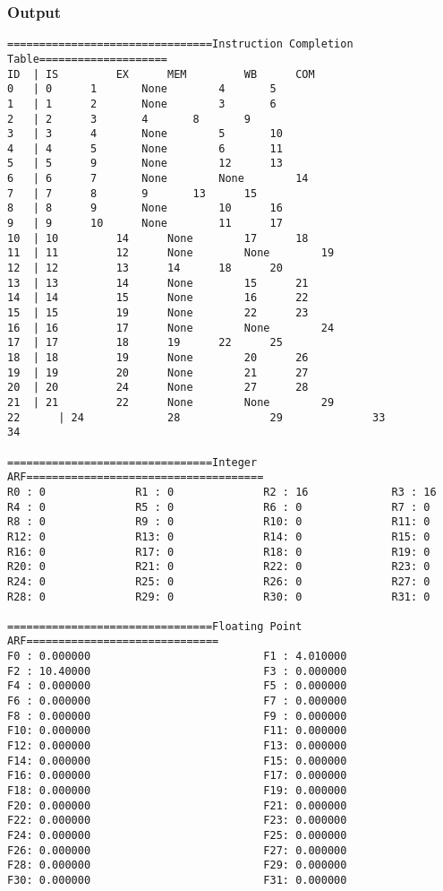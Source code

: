 \documentclass[12pt]{article}
\begin{document}
\subsubsection*{Output}
\begin{verbatim}
================================Instruction Completion Table====================
ID	| IS		 EX		 MEM		 WB		 COM
0	| 0		 1		 None		 4		 5
1	| 1		 2		 None		 3		 6
2	| 2		 3		 4		 8		 9
3	| 3		 4		 None		 5		 10
4	| 4		 5		 None		 6		 11
5	| 5		 9		 None		 12		 13
6	| 6		 7		 None		 None		 14
7	| 7		 8		 9		 13		 15
8	| 8		 9		 None		 10		 16
9	| 9		 10		 None		 11		 17
10	| 10		 14		 None		 17		 18
11	| 11		 12		 None		 None		 19
12	| 12		 13		 14		 18		 20
13	| 13		 14		 None		 15		 21
14	| 14		 15		 None		 16		 22
15	| 15		 19		 None		 22		 23
16	| 16		 17		 None		 None		 24
17	| 17		 18		 19		 22		 25
18	| 18		 19		 None		 20		 26
19	| 19		 20		 None		 21		 27
20	| 20		 24		 None		 27		 28
21	| 21		 22		 None		 None		 29
22      | 24             28              29              33              34

================================Integer ARF=====================================
R0 : 0              R1 : 0              R2 : 16             R3 : 16             
R4 : 0              R5 : 0              R6 : 0              R7 : 0              
R8 : 0              R9 : 0              R10: 0              R11: 0              
R12: 0              R13: 0              R14: 0              R15: 0              
R16: 0              R17: 0              R18: 0              R19: 0              
R20: 0              R21: 0              R22: 0              R23: 0              
R24: 0              R25: 0              R26: 0              R27: 0              
R28: 0              R29: 0              R30: 0              R31: 0              

================================Floating Point ARF==============================
F0 : 0.000000                           F1 : 4.010000                           
F2 : 10.40000                           F3 : 0.000000                           
F4 : 0.000000                           F5 : 0.000000                           
F6 : 0.000000                           F7 : 0.000000                           
F8 : 0.000000                           F9 : 0.000000                           
F10: 0.000000                           F11: 0.000000                           
F12: 0.000000                           F13: 0.000000                           
F14: 0.000000                           F15: 0.000000                           
F16: 0.000000                           F17: 0.000000                           
F18: 0.000000                           F19: 0.000000                           
F20: 0.000000                           F21: 0.000000                           
F22: 0.000000                           F23: 0.000000                           
F24: 0.000000                           F25: 0.000000                           
F26: 0.000000                           F27: 0.000000                           
F28: 0.000000                           F29: 0.000000                           
F30: 0.000000                           F31: 0.000000                           



\end{verbatim}
\end{document}
